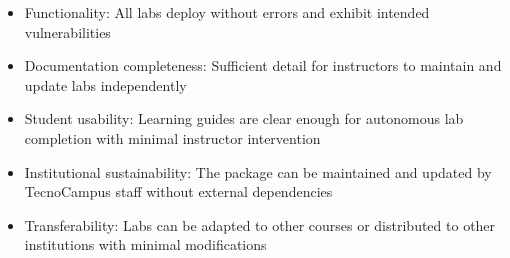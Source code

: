 \begin{itemize}
    \item Functionality: All labs deploy without errors and exhibit intended vulnerabilities
    \item Documentation completeness: Sufficient detail for instructors to maintain 
          and update labs independently
    \item Student usability: Learning guides are clear enough for autonomous lab 
          completion with minimal instructor intervention
    \item Institutional sustainability: The package can be maintained and updated 
          by TecnoCampus staff without external dependencies
    \item Transferability: Labs can be adapted to other courses or distributed 
          to other institutions with minimal modifications
\end{itemize}

